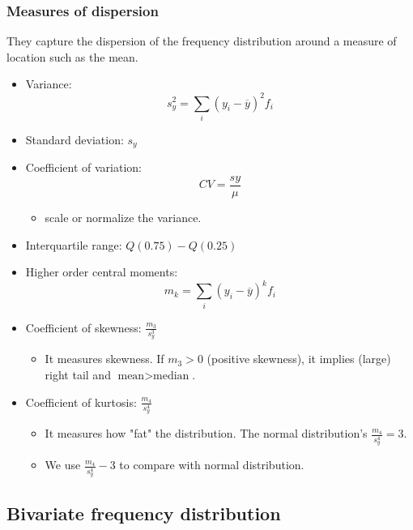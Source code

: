 \subsubsection{Measures of dispersion} They capture the dispersion of the frequency distribution around a measure of location such as the mean.

\begin{itemize}
    \item Variance: \[
              s _ {y} ^ {2} = \sum_ {i} (y _ {i} - \overline {{y}}) ^ {2} f _ {i}
          \]
    \item Standard deviation: $s_{y}$
    \item Coefficient of variation: \[
              CV = \frac {s y}{\mu}
          \] \begin{itemize}
              \item scale or normalize the variance.
          \end{itemize}
    \item Interquartile range: $Q(0.75)-Q(0.25)$
    \item Higher order central moments: \[
              m _ {k} = \sum_ {i} (y _ {i} - \overline {{y}}) ^ {k} f _ {i}
          \]
    \item   Coefficient of skewness: $\frac {m _ {3}}{s _ {y} ^ {3}}$ \begin{itemize}
              \item It measures skewness. If $m_3 > 0$ (positive skewness), it implies (large) right tail and $\text{mean} > \text{median}$.
          \end{itemize}
    \item   Coefficient of kurtosis: $\frac {m _ {4}}{s _ {y} ^ {4}}$ \begin{itemize}
              \item It measures how "fat" the distribution. The normal distribution's $\frac{m_4}{s_y^4} = 3$.
              \item We use $\frac{m_4}{s_y^4} - 3$ to compare with normal distribution.
          \end{itemize}
\end{itemize}

\subsection{Bivariate frequency distribution}

